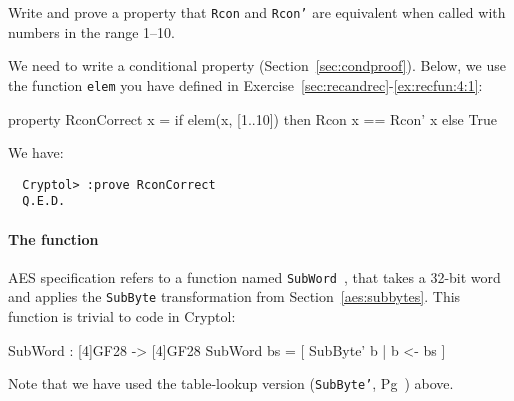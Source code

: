 \begin{Exercise}\label{ex:aeskerc:1}
  Write and prove a property that {\tt Rcon} and {\tt Rcon'} are
  equivalent when called with numbers in the range 1--10.
\end{Exercise}
\begin{Answer}
  We need to write a conditional property
  (Section~\ref{sec:condproof})\indThmCond. Below, we use the function
  {\tt elem} you have defined in
  Exercise~\ref{sec:recandrec}-\ref{ex:recfun:4:1}:\indElem
\begin{code}
  property RconCorrect x = if elem(x, [1..10])
                           then Rcon x == Rcon' x
                           else True
\end{code}
We have:
\begin{Verbatim}
  Cryptol> :prove RconCorrect
  Q.E.D.
\end{Verbatim}
\end{Answer}


\paragraph*{The {} function} AES\indAES
specification refers to a function named {\tt SubWord}~\cite[Section
5.2]{aes}, that takes a 32-bit word and applies the {\tt SubByte}
transformation from Section~\ref{aes:subbytes}. This function is
trivial to code in Cryptol:
\begin{code}
  SubWord : [4]GF28 -> [4]GF28
  SubWord bs = [ SubByte' b | b <- bs ]
\end{code}
Note that we have used the table-lookup version ({\tt SubByte'},
Pg~\pageref{aes:subbytetl}) above.

